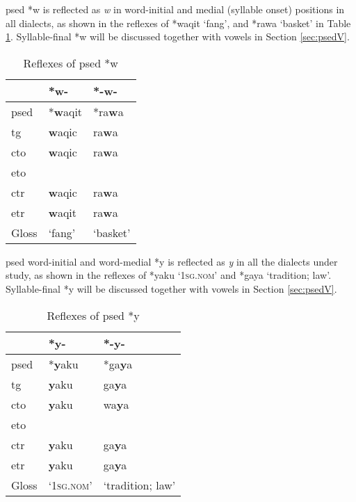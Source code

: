 
\acl{psed} *w is reflected as \textit{w} in word-initial and medial (syllable onset) positions in all dialects, as shown in the reflexes of *waqit `fang', and *rawa `basket' in Table \ref{tab:psed_w}. Syllable-final *w will be discussed together with vowels in Section \ref{sec:psedV}.

\begin{table}[!htbp]
\centering
\caption{Reflexes of \acl{psed} *w}
\label{tab:psed_w}
\begin{tabular}{lll}
\hline
           & *w-    & *-w-     \\ \hline
\acs{psed} & *\textbf{w}aqit & *ra\textbf{w}a    \\ \hdashline
\acs{tg}   & \textbf{w}aqic  & ra\textbf{w}a     \\
\acs{cto}  & \textbf{w}aqic  & ra\textbf{w}a     \\
\acs{eto}  &        &          \\
\acs{ctr}  & \textbf{w}aqic  & ra\textbf{w}a     \\
\acs{etr}  & \textbf{w}aqit  & ra\textbf{w}a     \\ \hline
Gloss      & `fang' & `basket' \\ \hline
\end{tabular}
\end{table}

\acl{psed} word-initial and word-medial *y is reflected as \textit{y} in all the dialects under study, as shown in the reflexes of *yaku `\textsc{1sg.nom}' and *gaya `tradition; law'. Syllable-final *y will be discussed together with vowels in Section \ref{sec:psedV}.

\begin{table}[!htbp]
\centering
\caption{Reflexes of \acl{psed} *y}
\label{tab:psed_y}
\begin{tabular}{lll}
\hline
           & *y-                & *-y-             \\ \hline
\acs{psed} & *\textbf{y}aku              & *ga\textbf{y}a            \\ \hdashline
\acs{tg}   & \textbf{y}aku               & ga\textbf{y}a             \\
\acs{cto}  & \textbf{y}aku               & wa\textbf{y}a             \\
\acs{eto}  &                    &                  \\
\acs{ctr}  & \textbf{y}aku               & ga\textbf{y}a             \\
\acs{etr}  & \textbf{y}aku               & ga\textbf{y}a             \\ \hline
Gloss      & `\textsc{1sg.nom}' & `tradition; law' \\ \hline
\end{tabular}
\end{table}

